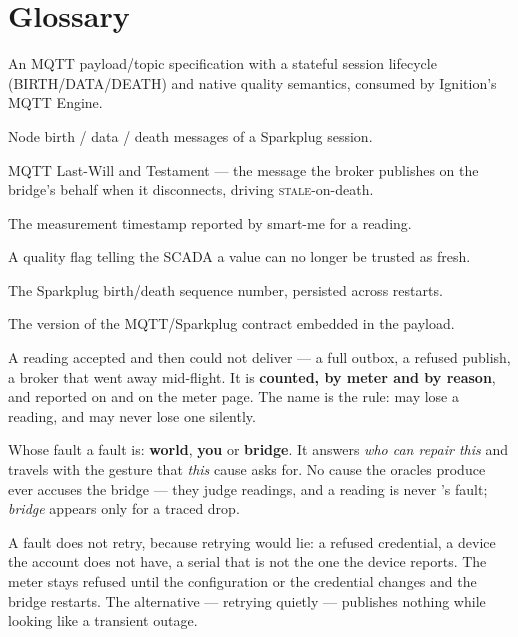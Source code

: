 \chapter{Glossary}
\label{app:glossary}

\begin{description}[style=nextline, leftmargin=0pt]
  \item[Sparkplug~B] An MQTT payload/topic specification with a stateful session lifecycle
        (BIRTH/DATA/DEATH) and native quality semantics, consumed by Ignition's MQTT Engine.
  \item[NBIRTH / NDATA / NDEATH] Node birth / data / death messages of a Sparkplug session.
  \item[LWT] MQTT Last-Will and Testament — the message the broker publishes on the
        bridge's behalf when it disconnects, driving \textsc{stale}-on-death.
  \item[\texttt{ValueDate}] The measurement timestamp reported by smart-me for a reading.
  \item[STALE] A quality flag telling the SCADA a value can no longer be trusted as fresh.
  \item[\texttt{bdSeq}] The Sparkplug birth/death sequence number, persisted across restarts.
  \item[CONTRACT\_VERSION] The version of the MQTT/Sparkplug contract embedded in the payload.
\item[Traced drop] A reading \prog accepted and then could not deliver --- a full outbox, a
  refused publish, a broker that went away mid-flight. It is \textbf{counted, by meter and by
  reason}, and reported on  and on the meter page. The name is the rule: \prog
  may lose a reading, and may never lose one silently.

\item[Culprit] Whose fault a fault is: \textbf{world}, \textbf{you} or \textbf{bridge}. It
  answers \emph{who can repair this} and travels with the gesture that \emph{this} cause asks
  for. No cause the oracles produce ever accuses the bridge --- they judge readings, and a
  reading is never \prog's fault; \emph{bridge} appears only for a traced drop.

\item[Latched fault] A fault \prog does not retry, because retrying would lie: a refused
  credential, a device the account does not have, a serial that is not the one the device
  reports. The meter stays refused until the configuration or the credential changes and the
  bridge restarts. The alternative --- retrying quietly --- publishes nothing while looking
  like a transient outage.


\end{description}
